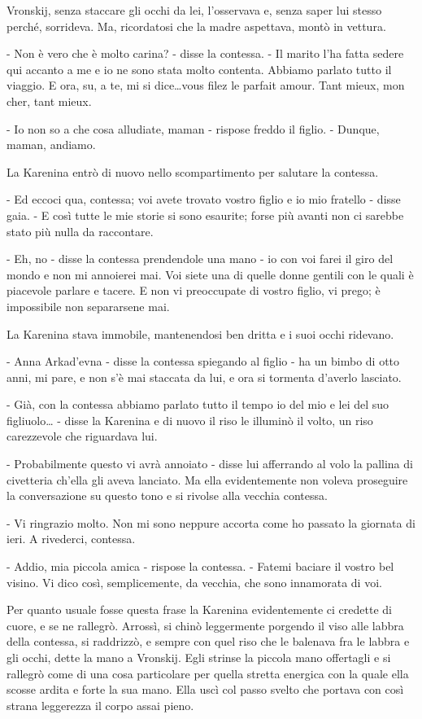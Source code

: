 Vronskij, senza staccare gli occhi da lei, l'osservava e, senza saper lui stesso perché, sorrideva. Ma, ricordatosi che la madre aspettava, montò in vettura. 

- Non è vero che è molto carina? - disse la contessa. - Il marito l'ha fatta sedere qui accanto a me e io ne sono stata molto contenta. Abbiamo parlato tutto il viaggio. E ora, su, a te, mi si dice\ldots{}vous filez le parfait amour. Tant mieux, mon cher, tant mieux. 

- Io non so a che cosa alludiate, maman - rispose freddo il figlio. - Dunque, maman, andiamo. 

La Karenina entrò di nuovo nello scompartimento per salutare la contessa. 

- Ed eccoci qua, contessa; voi avete trovato vostro figlio e io mio fratello - disse gaia. - E così tutte le mie storie si sono esaurite; forse più avanti non ci sarebbe stato più nulla da raccontare. 

- Eh, no - disse la contessa prendendole una mano - io con voi farei il giro del mondo e non mi annoierei mai. Voi siete una di quelle donne gentili con le quali è piacevole parlare e tacere. E non vi preoccupate di vostro figlio, vi prego; è impossibile non separarsene mai. 

La Karenina stava immobile, mantenendosi ben dritta e i suoi occhi ridevano. 

- Anna Arkad'evna - disse la contessa spiegando al figlio - ha un bimbo di otto anni, mi pare, e non s'è mai staccata da lui, e ora si tormenta d'averlo lasciato. 

- Già, con la contessa abbiamo parlato tutto il tempo io del mio e lei del suo figliuolo\ldots{} - disse la Karenina e di nuovo il riso le illuminò il volto, un riso carezzevole che riguardava lui. 

- Probabilmente questo vi avrà annoiato - disse lui afferrando al volo la pallina di civetteria ch'ella gli aveva lanciato. Ma ella evidentemente non voleva proseguire la conversazione su questo tono e si rivolse alla vecchia contessa. 

- Vi ringrazio molto. Non mi sono neppure accorta come ho passato la giornata di ieri. A rivederci, contessa. 

- Addio, mia piccola amica - rispose la contessa. - Fatemi baciare il vostro bel visino. Vi dico così, semplicemente, da vecchia, che sono innamorata di voi. 

Per quanto usuale fosse questa frase la Karenina evidentemente ci credette di cuore, e se ne rallegrò. Arrossì, si chinò leggermente porgendo il viso alle labbra della contessa, si raddrizzò, e sempre con quel riso che le balenava fra le labbra e gli occhi, dette la mano a Vronskij. Egli strinse la piccola mano offertagli e si rallegrò come di una cosa particolare per quella stretta energica con la quale ella scosse ardita e forte la sua mano. Ella uscì col passo svelto che portava con così strana leggerezza il corpo assai pieno. 

